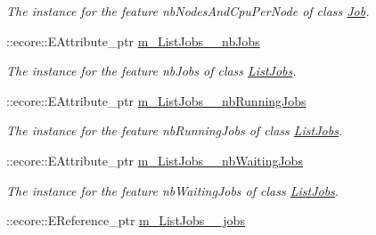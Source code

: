 \begin{DoxyCompactItemize}
\begin{DoxyCompactList}\small\item\em The instance for the feature nbNodesAndCpuPerNode of class \hyperlink{classTMS__Data_1_1Job}{Job}. \item\end{DoxyCompactList}\item 
\hypertarget{classTMS__Data_1_1TMS__DataPackage_af3361a52cc9764be759f76778c6514f2}{
::ecore::EAttribute\_\-ptr \hyperlink{classTMS__Data_1_1TMS__DataPackage_af3361a52cc9764be759f76778c6514f2}{m\_\-ListJobs\_\-\_\-nbJobs}}
\label{classTMS__Data_1_1TMS__DataPackage_af3361a52cc9764be759f76778c6514f2}

\begin{DoxyCompactList}\small\item\em The instance for the feature nbJobs of class \hyperlink{classTMS__Data_1_1ListJobs}{ListJobs}. \item\end{DoxyCompactList}\item 
\hypertarget{classTMS__Data_1_1TMS__DataPackage_aa0dc7f84b0cb523d85feef51ea200e6b}{
::ecore::EAttribute\_\-ptr \hyperlink{classTMS__Data_1_1TMS__DataPackage_aa0dc7f84b0cb523d85feef51ea200e6b}{m\_\-ListJobs\_\-\_\-nbRunningJobs}}
\label{classTMS__Data_1_1TMS__DataPackage_aa0dc7f84b0cb523d85feef51ea200e6b}

\begin{DoxyCompactList}\small\item\em The instance for the feature nbRunningJobs of class \hyperlink{classTMS__Data_1_1ListJobs}{ListJobs}. \item\end{DoxyCompactList}\item 
\hypertarget{classTMS__Data_1_1TMS__DataPackage_a7d40d4565e025a47d7f1860eaca62e68}{
::ecore::EAttribute\_\-ptr \hyperlink{classTMS__Data_1_1TMS__DataPackage_a7d40d4565e025a47d7f1860eaca62e68}{m\_\-ListJobs\_\-\_\-nbWaitingJobs}}
\label{classTMS__Data_1_1TMS__DataPackage_a7d40d4565e025a47d7f1860eaca62e68}

\begin{DoxyCompactList}\small\item\em The instance for the feature nbWaitingJobs of class \hyperlink{classTMS__Data_1_1ListJobs}{ListJobs}. \item\end{DoxyCompactList}\item 
\hypertarget{classTMS__Data_1_1TMS__DataPackage_a644eded48e5070804689ed176039fca1}{
::ecore::EReference\_\-ptr \hyperlink{classTMS__Data_1_1TMS__DataPackage_a644eded48e5070804689ed176039fca1}{m\_\-ListJobs\_\-\_\-jobs}}
\label{classTMS__Data_1_1TMS__DataPackage_a644eded48e5070804689ed176039fca1}


\end{DoxyCompactItemize}
